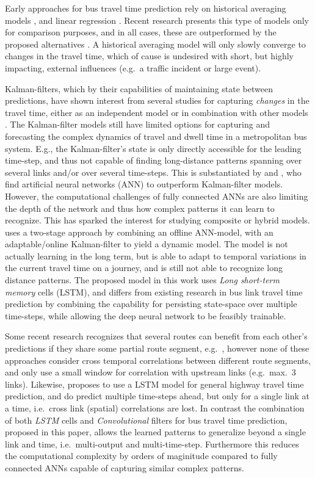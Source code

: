 ﻿\documentclass[preprint,11pt,5p,twocolumn]{elsarticle}
\begin{document}
Early approaches for bus travel time prediction rely on historical averaging models \cite{Dailey1999,Sun2007}, and linear regression \cite{Patnaik2004}. Recent research presents this type of models only for comparison purposes, and in all cases, these are outperformed by the proposed alternatives \cite{Shalaby2004,Jeong2005}. A historical averaging model will only slowly converge to changes in the travel time, which of cause is undesired with short, but highly impacting, external influences (e.g.\ a traffic incident or large event). 

Kalman-filters, which by their capabilities of maintaining state between predictions, have shown interest from several studies for capturing \emph{changes} in the travel time, either as an independent model \cite{Chen2001,Shalaby2004} or in combination with other models \cite{Yo2010,Bai2015}. The Kalman-filter models still have limited options for capturing and forecasting the complex dynamics of travel and dwell time in a metropolitan bus system. E.g., the Kalman-filter's state is only directly accessible for the leading time-step, and thus not capable of finding long-distance patterns spanning over several links and/or over several time-steps. This is substantiated by \cite{Lin2013} and \cite{Kumar2014}, who find artificial neural networks (ANN) to outperform Kalman-filter models. However, the computational challenges of fully connected ANNs are also limiting the depth of the network and thus how complex patterns it can learn to recognize. This has sparked the interest for studying composite or hybrid models. \citet{Bai2015} uses a two-stage approach by combining an offline ANN-model, with an adaptable/online Kalman-filter to yield a dynamic model. The model is not actually learning in the long term, but is able to adapt to temporal variations in the current travel time on a journey, and is still not able to recognize long distance patterns. The proposed model in this work uses \emph{Long short-term memory} cells (LSTM), and differs from existing research in bus link travel time prediction by combining the capability for persisting state-space over multiple time-steps, while allowing the deep neural network to be feasibly trainable.

Some recent research recognizes that several routes can benefit from each other's predictions if they share some partial route segment, e.g.\ \cite{Yu2011,Gal2014,Bai2015}, however none of these approaches consider cross temporal correlations between different route segments, and only use a small window for correlation with upstream links (e.g.\ max.\ 3 links). Likewise, \citet{YanjieDuan2016} proposes to use a LSTM model for general highway travel time prediction, and do predict multiple time-steps ahead, but only for a single link at a time, i.e.\ cross link (spatial) correlations are lost. In contrast the combination of both \emph{LSTM} cells and \emph{Convolutional} filters for bus travel time prediction, proposed in this paper, allows the learned patterns to generalize beyond a single link and time, i.e.\ multi-output and multi-time-step. Furthermore this reduces the computational complexity by orders of maginitude compared to fully connected ANNs capable of capturing similar complex patterns.
\end{document}
